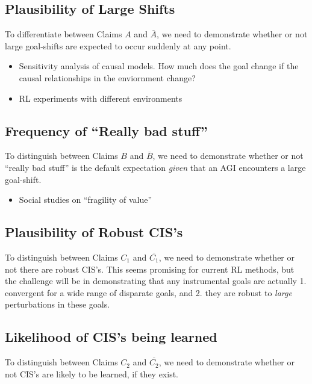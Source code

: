 \documentclass{article}
\begin{document}
\subsection{Plausibility of Large Shifts}
To differentiate between Claims $A$ and $\overline{A}$, we need to demonstrate whether or not large goal-shifts are expected to occur suddenly at any point. 
\begin{itemize}
    \item Sensitivity analysis of causal models. How much does the goal change if the causal relationships in the enviornment change?
    \item RL experiments with different environments
\end{itemize}

\subsection{Frequency of ``Really bad stuff”}
To distinguish between Claims $B$ and $\overline{B}$, we need to demonstrate whether or not “really bad stuff” is the default expectation \emph{given} that an AGI encounters a large goal-shift.
\begin{itemize}
    \item Social studies on “fragility of value”
\end{itemize}
\subsection{Plausibility of Robust CIS's}
To distinguish between Claims $C_1$ and $\overline{C_1}$, we need to demonstrate whether or not there are robust CIS's. This seems promising for current RL methods, but the challenge will be in demonstrating that any instrumental goals are actually 1. convergent for a wide range of disparate goals, and 2. they are robust to \emph{large} perturbations in these goals.
\subsection{Likelihood of CIS's being learned}
To distinguish between Claims $C_2$ and $\overline{C_2}$, we need to demonstrate whether or not CIS's are likely to be learned, if they exist.
\end{document}
